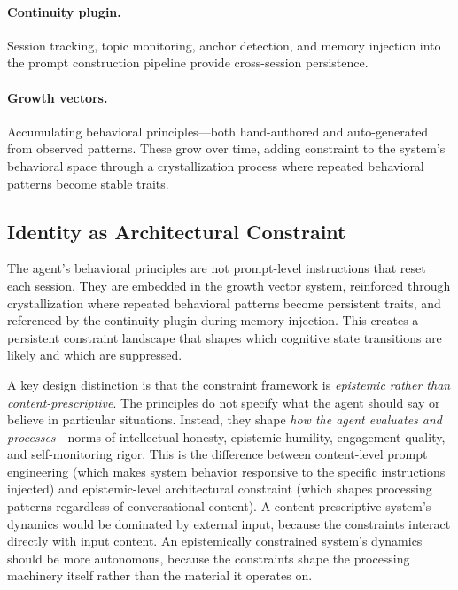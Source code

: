 \documentclass[twoside,11pt]{article}
\begin{document}
\paragraph{Continuity plugin.} Session tracking, topic monitoring, anchor
detection, and memory injection into the prompt construction pipeline provide
cross-session persistence.

\paragraph{Growth vectors.} Accumulating behavioral principles---both
hand-authored and auto-generated from observed patterns. These grow over time,
adding constraint to the system's behavioral space through a crystallization
process where repeated behavioral patterns become stable traits.

\subsection{Identity as Architectural Constraint}
\label{sec:arch-identity}

The agent's behavioral principles are not prompt-level instructions that reset
each session. They are embedded in the growth vector system, reinforced through
crystallization where repeated behavioral patterns become persistent traits,
and referenced by the continuity plugin during memory injection. This creates a
persistent constraint landscape that shapes which cognitive state transitions
are likely and which are suppressed.

A key design distinction is that the constraint framework is
\emph{epistemic rather than content-prescriptive}. The principles do not
specify what the agent should say or believe in particular situations. Instead,
they shape \emph{how the agent evaluates and processes}---norms of
intellectual honesty, epistemic humility, engagement quality, and
self-monitoring rigor. This is the difference between content-level prompt
engineering (which makes system behavior responsive to the specific
instructions injected) and epistemic-level architectural constraint (which
shapes processing patterns regardless of conversational content). A
content-prescriptive system's dynamics would be dominated by external input,
because the constraints interact directly with input content. An
epistemically constrained system's dynamics should be more autonomous, because
the constraints shape the processing machinery itself rather than the material
it operates on.
\end{document}
